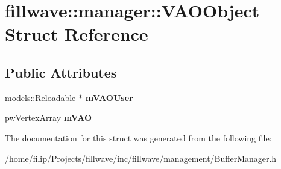 \hypertarget{structfillwave_1_1manager_1_1VAOObject}{}\section{fillwave\+:\+:manager\+:\+:V\+A\+O\+Object Struct Reference}
\label{structfillwave_1_1manager_1_1VAOObject}
\subsection*{Public Attributes}
\begin{DoxyCompactItemize}
\item 
\hypertarget{structfillwave_1_1manager_1_1VAOObject_a3ee6eac48425441dc813e71de65e5d7b}{}\hyperlink{classfillwave_1_1models_1_1Reloadable}{models\+::\+Reloadable} $\ast$ {\bfseries m\+V\+A\+O\+User}\label{structfillwave_1_1manager_1_1VAOObject_a3ee6eac48425441dc813e71de65e5d7b}

\item 
\hypertarget{structfillwave_1_1manager_1_1VAOObject_ab8763c9f71df978c8fbb320d605302cd}{}pw\+Vertex\+Array {\bfseries m\+V\+A\+O}\label{structfillwave_1_1manager_1_1VAOObject_ab8763c9f71df978c8fbb320d605302cd}

\end{DoxyCompactItemize}


The documentation for this struct was generated from the following file\+:\begin{DoxyCompactItemize}
\item 
/home/filip/\+Projects/fillwave/inc/fillwave/management/Buffer\+Manager.\+h\end{DoxyCompactItemize}

